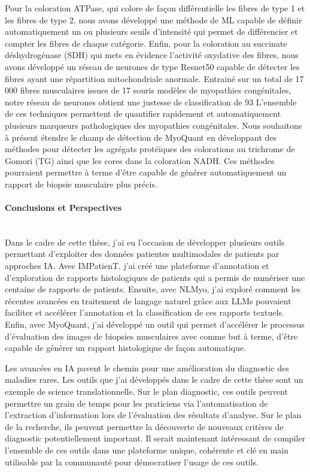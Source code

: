 Pour la coloration ATPase, qui colore de façon différentielle les fibres de type 1 et les fibres de type 2, nous avons développé une méthode de ML capable de définir automatiquement un ou plusieurs seuils d’intensité qui permet de différencier et compter les fibres de chaque catégorie.
Enfin, pour la coloration au succinate déshydrogénase (SDH) qui mets en évidence l’activité oxydative des fibres, nous avons développé un réseau de neurones de type Resnet50 capable de détecter les fibres ayant une répartition mitochondriale anormale. Entrainé sur un total de 17 000 fibres musculaires issues de 17 souris modèles de myopathies congénitales, notre réseau de neurones obtient une justesse de classification de 93 %
L’ensemble de ces techniques permettent de quantifier rapidement et automatiquement plusieurs marqueurs pathologiques des myopathies congénitales. Nous souhaitons à présent étendre le champ de détection de MyoQuant en développant des méthodes pour détecter les agrégats protéiques des colorations au trichrome de Gomori (TG) ainsi que les cores  dans la coloration NADH. Ces méthodes pourraient permettre à terme d’être capable de générer automatiquement un rapport de biopsie musculaire plus précis. 

\paragraph{\textbf{Conclusions et Perspectives}}\mbox{}\\

Dans le cadre de cette thèse, j’ai eu l’occasion de développer plusieurs outils permettant d’exploiter des données patientes multimodales de patients par approches IA. Avec IMPatienT, j’ai créé une plateforme d’annotation et d’exploration de rapports histologiques de patients qui a permis de numériser une centaine de rapports de patients. Ensuite, avec NLMyo, j’ai exploré comment les récentes avancées en traitement de langage naturel grâce aux LLMs pouvaient faciliter et accélérer l’annotation et la classification de ces rapports textuels. Enfin, avec MyoQuant, j’ai développé un outil qui permet d’accélérer le processus d’évaluation des images de biopsies musculaires avec comme but à terme, d’être capable de générer un rapport histologique de façon automatique.

Les avancées en IA pavent le chemin pour une amélioration du diagnostic des maladies rares. Les outils que j’ai développés dans le cadre de cette thèse sont un exemple de science translationnelle. Sur le plan diagnostic, ces outils peuvent permettre un grain de temps pour les praticiens via l’automatisation de l’extraction d’information lors de l’évaluation des résultats d’analyse. Sur le plan de la recherche, ils peuvent permettre la découverte de nouveaux critères de diagnostic potentiellement important. Il serait maintenant intéressant de compiler l’ensemble de ces outils dans une plateforme unique, cohérente et clé en main utilisable par la communauté pour démocratiser l’usage de ces outils.

